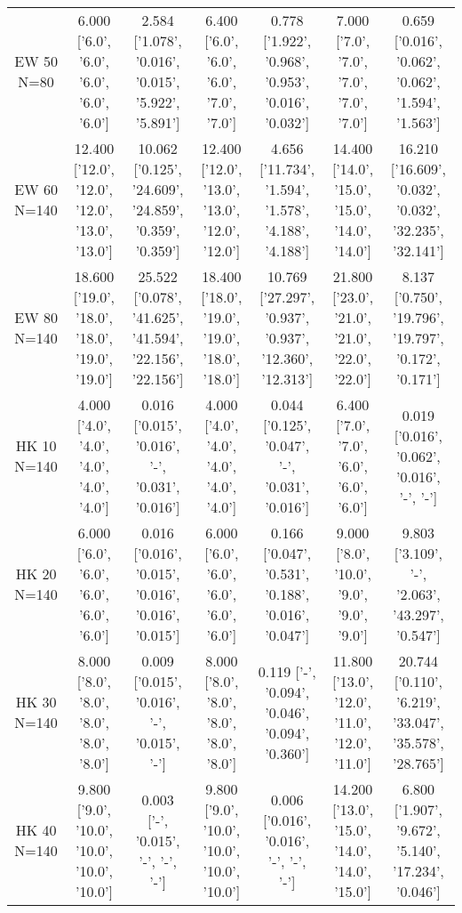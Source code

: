 \documentclass[landscape, 12pt]{report}
\begin{document}
\begin{tabular}{|c|cc|cc|cc|}
\\
EW 50 N=80 & 6.000 ['6.0', '6.0', '6.0', '6.0', '6.0'] & 2.584 ['1.078', '0.016', '0.015', '5.922', '5.891'] & 6.400 ['6.0', '6.0', '6.0', '7.0', '7.0'] & 0.778 ['1.922', '0.968', '0.953', '0.016', '0.032'] & 7.000 ['7.0', '7.0', '7.0', '7.0', '7.0'] & 0.659 ['0.016', '0.062', '0.062', '1.594', '1.563']
\\
EW 60 N=140 & 12.400 ['12.0', '12.0', '12.0', '13.0', '13.0'] & 10.062 ['0.125', '24.609', '24.859', '0.359', '0.359'] & 12.400 ['12.0', '13.0', '13.0', '12.0', '12.0'] & 4.656 ['11.734', '1.594', '1.578', '4.188', '4.188'] & 14.400 ['14.0', '15.0', '15.0', '14.0', '14.0'] & 16.210 ['16.609', '0.032', '0.032', '32.235', '32.141']
\\
EW 80 N=140 & 18.600 ['19.0', '18.0', '18.0', '19.0', '19.0'] & 25.522 ['0.078', '41.625', '41.594', '22.156', '22.156'] & 18.400 ['18.0', '19.0', '19.0', '18.0', '18.0'] & 10.769 ['27.297', '0.937', '0.937', '12.360', '12.313'] & 21.800 ['23.0', '21.0', '21.0', '22.0', '22.0'] & 8.137 ['0.750', '19.796', '19.797', '0.172', '0.171']
\\
HK 10 N=140 & 4.000 ['4.0', '4.0', '4.0', '4.0', '4.0'] & 0.016 ['0.015', '0.016', '-', '0.031', '0.016'] & 4.000 ['4.0', '4.0', '4.0', '4.0', '4.0'] & 0.044 ['0.125', '0.047', '-', '0.031', '0.016'] & 6.400 ['7.0', '7.0', '6.0', '6.0', '6.0'] & 0.019 ['0.016', '0.062', '0.016', '-', '-']
\\
HK 20 N=140 & 6.000 ['6.0', '6.0', '6.0', '6.0', '6.0'] & 0.016 ['0.016', '0.015', '0.016', '0.016', '0.015'] & 6.000 ['6.0', '6.0', '6.0', '6.0', '6.0'] & 0.166 ['0.047', '0.531', '0.188', '0.016', '0.047'] & 9.000 ['8.0', '10.0', '9.0', '9.0', '9.0'] & 9.803 ['3.109', '-', '2.063', '43.297', '0.547']
\\
HK 30 N=140 & 8.000 ['8.0', '8.0', '8.0', '8.0', '8.0'] & 0.009 ['0.015', '0.016', '-', '0.015', '-'] & 8.000 ['8.0', '8.0', '8.0', '8.0', '8.0'] & 0.119 ['-', '0.094', '0.046', '0.094', '0.360'] & 11.800 ['13.0', '12.0', '11.0', '12.0', '11.0'] & 20.744 ['0.110', '6.219', '33.047', '35.578', '28.765']
\\
HK 40 N=140 & 9.800 ['9.0', '10.0', '10.0', '10.0', '10.0'] & 0.003 ['-', '0.015', '-', '-', '-'] & 9.800 ['9.0', '10.0', '10.0', '10.0', '10.0'] & 0.006 ['0.016', '0.016', '-', '-', '-'] & 14.200 ['13.0', '15.0', '14.0', '14.0', '15.0'] & 6.800 ['1.907', '9.672', '5.140', '17.234', '0.046']
\\
\hline 
 \end{tabular}
\end{document}
